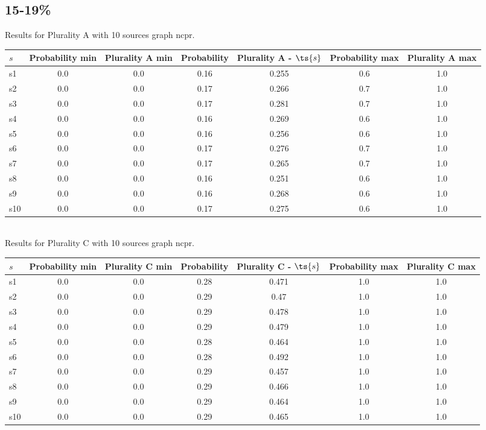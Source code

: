 \documentclass{article}
\begin{document}
\newpage

\subsection{15-19\%}

\noindent Results for Plurality A with 10 sources graph ncpr.

\noindent\begin{tabular}{|l|c|c|c|c|c|c|}
\hline
$s$& Probability min & Plurality A min & Probability & Plurality A - $\ts{s}$ & Probability max & Plurality A max\\
\hline
s1 &0.0 & 0.0 & 0.16 & 0.255 & 0.6 & 1.0\\
\hline
s2 &0.0 & 0.0 & 0.17 & 0.266 & 0.7 & 1.0\\
\hline
s3 &0.0 & 0.0 & 0.17 & 0.281 & 0.7 & 1.0\\
\hline
s4 &0.0 & 0.0 & 0.16 & 0.269 & 0.6 & 1.0\\
\hline
s5 &0.0 & 0.0 & 0.16 & 0.256 & 0.6 & 1.0\\
\hline
s6 &0.0 & 0.0 & 0.17 & 0.276 & 0.7 & 1.0\\
\hline
s7 &0.0 & 0.0 & 0.17 & 0.265 & 0.7 & 1.0\\
\hline
s8 &0.0 & 0.0 & 0.16 & 0.251 & 0.6 & 1.0\\
\hline
s9 &0.0 & 0.0 & 0.16 & 0.268 & 0.6 & 1.0\\
\hline
s10 &0.0 & 0.0 & 0.17 & 0.275 & 0.6 & 1.0\\
\hline
\end{tabular}\\

\noindent Results for Plurality C with 10 sources graph ncpr.

\noindent\begin{tabular}{|l|c|c|c|c|c|c|}
\hline
$s$& Probability min & Plurality C min & Probability & Plurality C - $\ts{s}$ & Probability max & Plurality C max\\
\hline
s1 &0.0 & 0.0 & 0.28 & 0.471 & 1.0 & 1.0\\
\hline
s2 &0.0 & 0.0 & 0.29 & 0.47 & 1.0 & 1.0\\
\hline
s3 &0.0 & 0.0 & 0.29 & 0.478 & 1.0 & 1.0\\
\hline
s4 &0.0 & 0.0 & 0.29 & 0.479 & 1.0 & 1.0\\
\hline
s5 &0.0 & 0.0 & 0.28 & 0.464 & 1.0 & 1.0\\
\hline
s6 &0.0 & 0.0 & 0.28 & 0.492 & 1.0 & 1.0\\
\hline
s7 &0.0 & 0.0 & 0.29 & 0.457 & 1.0 & 1.0\\
\hline
s8 &0.0 & 0.0 & 0.29 & 0.466 & 1.0 & 1.0\\
\hline
s9 &0.0 & 0.0 & 0.29 & 0.464 & 1.0 & 1.0\\
\hline
s10 &0.0 & 0.0 & 0.29 & 0.465 & 1.0 & 1.0\\
\hline
\end{tabular}\\
\end{document}
